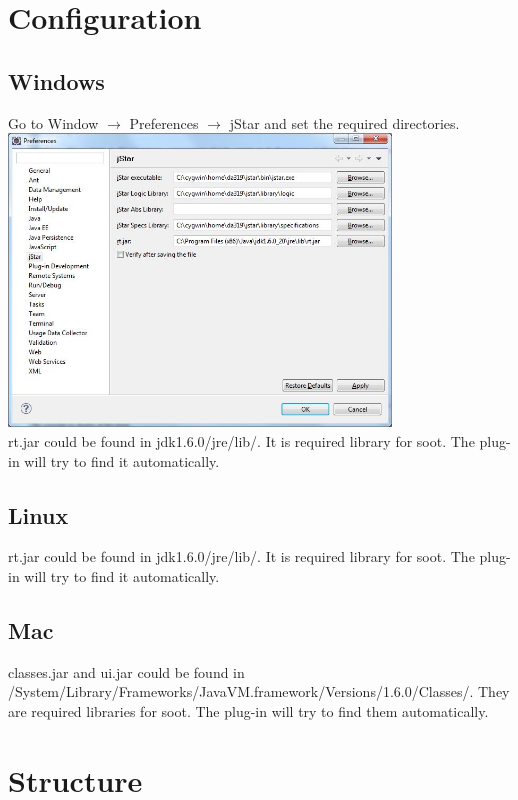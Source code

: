 \documentclass{article}
\begin{document}
\section{Configuration}

\subsection{Windows}

Go to Window $\rightarrow$ Preferences $\rightarrow$ jStar and set the required directories.\\

\includegraphics[width=4in]{images/preferences.jpg}\\

rt.jar could be found in jdk1.6.0/jre/lib/. It is required library for soot. The plug-in will try to find it automatically. 

\subsection{Linux}
rt.jar could be found in jdk1.6.0/jre/lib/. It is required library for soot. The plug-in will try to find it automatically. 

\subsection{Mac}
classes.jar and ui.jar could be found in \\ /System/Library/Frameworks/JavaVM.framework/Versions/1.6.0/Classes/.  They are required libraries for soot. The plug-in will try to find them automatically. 

\section {Structure}
\end{document}
